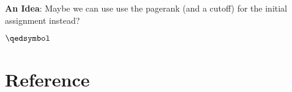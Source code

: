 \documentclass[a4paper,10pt]{article}
\theoremstyle{definition}
\theoremstyle{remark}
\theoremstyle{plain}
\begin{document}
\textbf{An Idea}: Maybe we can use use the pagerank (and a cutoff) for the
initial assignment instead?

$\qedsymbol$


%


\nocite{herstein_winter_1989}
\nocite{meyer2000matrix}
\begin{comment}
\section{Tests}
\nocite{herstein_winter_1989}
\nocite{goodfellow2016deep}
\nocite{meyer2000matrix}

%
%
%

\end{comment}

\section{Reference}

%
% 
\printbibliography
\end{document}
